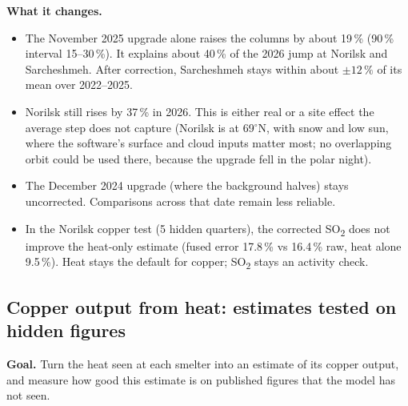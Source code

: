 \documentclass[10pt,a4paper]{article}
\newcommand{\SOtwo}{SO\textsubscript{2}}
\begin{document}
\textbf{What it changes.}
\begin{itemize}[leftmargin=1.2em]
  \item The November 2025 upgrade alone raises the columns by about 19\,\% (90\,\% interval 15--30\,\%). It explains about 40\,\% of the 2026 jump at Norilsk and Sarcheshmeh. After correction, Sarcheshmeh stays within about $\pm12\,\%$ of its mean over 2022--2025.
  \item Norilsk still rises by 37\,\% in 2026. This is either real or a site effect the average step does not capture (Norilsk is at 69$^\circ$N, with snow and low sun, where the software's surface and cloud inputs matter most; no overlapping orbit could be used there, because the upgrade fell in the polar night).
  \item The December 2024 upgrade (where the background halves) stays uncorrected. Comparisons across that date remain less reliable.
  \item In the Norilsk copper test (5 hidden quarters), the corrected \SOtwo{} does not improve the heat-only estimate (fused error 17.8\,\% vs 16.4\,\% raw, heat alone 9.5\,\%). Heat stays the default for copper; \SOtwo{} stays an activity check.
\end{itemize}

\subsection{Copper output from heat: estimates tested on hidden figures}\label{sec:production}

\textbf{Goal.} Turn the heat seen at each smelter into an estimate of its copper output, and measure how good this estimate is on published figures that the model has not seen.
\end{document}
